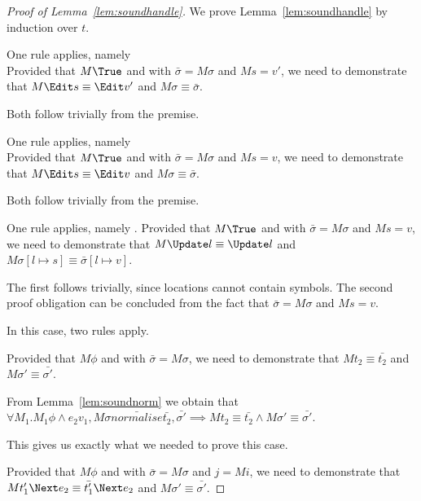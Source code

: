 


\begin{proof}[Proof of Lemma~\ref{lem:soundhandle}]
  We prove Lemma~\ref{lem:soundhandle} by induction over $t$.\\

    {One rule applies, namely \\
    Provided that $M\True$ and  with $\bar{\sigma}=M\sigma$ and $M s = v'$,
    we need to demonstrate that $M \Edit s\equiv \Edit v'$ and $ M\sigma\equiv \bar{\sigma}$.

    Both follow trivially from the premise.

    }

  {One rule applies, namely \\
  Provided that $M\True$ and  with $\bar{\sigma}=M\sigma$ and $M s = v$,
  we need to demonstrate that $M \Edit s \equiv \Edit v$ and $ M\sigma\equiv \bar{\sigma}$.

  Both follow trivially from the premise.

  }

  {One rule applies, namely .
  Provided that $M\True$ and  with $\bar{\sigma}=M\sigma$ and $M s = v$,
  we need to demonstrate that $M \Update l \equiv \Update l$ and $ M\sigma[l\mapsto s]\equiv \bar{\sigma}[l\mapsto v]$.

  The first follows trivially, since locations cannot contain symbols. The second proof obligation can be concluded from the fact that $\bar{\sigma}=M\sigma$ and $M s = v$.

  }

  {
  In this case, two rules apply.\\
      {Provided that $M\phi$ and  with $\bar{\sigma}=M\sigma$,
      we need to demonstrate that $M t_2 \equiv \bar{t_2}$ and $M\sigma'\equiv\bar{\sigma'}$.

      From Lemma~\ref{lem:soundnorm} we obtain that $\forall M_1. M_1 \phi \land e_2 v_1,M\sigma\bar{normalise}\bar{t_2},\bar{\sigma'}\implies M t_2\equiv\bar{t_2}\land M \sigma'\equiv\bar{\sigma'}$.

      This gives us exactly what we needed to prove this case.

      }
    {Provided that $M\phi$ and  with $\bar{\sigma}=M\sigma$ and $j= M i$,
    we need to demonstrate that $M t_1' \Next e_2 \equiv \bar{t_1'}\Next e_2$ and $M\sigma'\equiv\bar{\sigma'}$.

}}
\end{proof}
